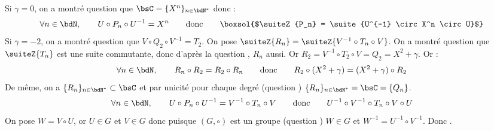 \documentclass[a4paper,french,bookmarks]{article}
\begin{document}
\begin{enumerate}
{        \begin{enumerate}
            \ithand Si $\gamma = 0$, on a montré question  que $\bsC = \{ X^n \}_{n \in \bdN^*}$ donc :
            \[\forall n \in \bdN,\qquad  U \circ P_n \circ U^{-1} = X^n \qquad\text{donc}\qquad \boxsol{$\suiteZ{P_n} = \suite{U^{-1} \circ X^n \circ U}$}\]
            \ithand Si $\gamma = -2$, on a montré question  que $V \circ Q_2 \circ V^{-1} = T_2$. On pose $\suiteZ{R_n} = \suiteZ{V^{-1} \circ T_n \circ V}$. On a montré question  que $\suiteZ{T_n}$ est une suite commutante, donc d'après la question , $R_n$ aussi.
            Or $R_2 = V^{-1} \circ T_2 \circ V = Q_2 = X^2 + \gamma$. Or :
            \[ \forall n \in \bdN,\qquad R_n \circ R_2 = R_2 \circ R_n \qquad\text{donc}\qquad R_2 \circ (X^2 + \gamma) = (X^2 + \gamma) \circ R_2\]
            De même, on a $\{R_n\}_{n \in \bdN^*} \subset \bsC$ et par unicité pour chaque degré (question )  $\{R_n\}_{n \in \bdN^*} = \bsC = \{Q_n\}$.
            \[ \forall n \in \bdN,\qquad U \circ P_n \circ U^{-1} = V^{-1} \circ T_n \circ V \qquad\text{donc}\qquad U^{-1} \circ V^{-1} \circ T_n \circ V \circ U\]
            On pose $W = V \circ U$, or $U \in G$ et $V \in G$ donc puisque $(G, \circ)$ est un groupe (question ) $W \in G$ et $W^{-1} = U^{-1} \circ V^{-1}$.
            Donc .
        \end{enumerate}
    }
\end{enumerate}
\end{document}
